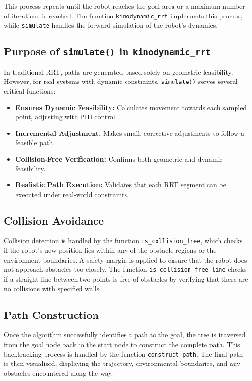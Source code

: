 \documentclass[12pt]{article}
\begin{document}
This process repeats until the robot reaches the goal area or a maximum number of iterations is reached. The function \texttt{kinodynamic\_rrt} implements this process, while \texttt{simulate} handles the forward simulation of the robot’s dynamics.
    
\subsection{Purpose of \texttt{simulate()} in \texttt{kinodynamic\_rrt}}
In traditional RRT, paths are generated based solely on geometric feasibility. However, for real systems with dynamic constraints, \texttt{simulate()} serves several critical functions:
\begin{itemize}
    \item \textbf{Ensures Dynamic Feasibility:} Calculates movement towards each sampled point, adjusting with PID control.
    \item \textbf{Incremental Adjustment:} Makes small, corrective adjustments to follow a feasible path.
    \item \textbf{Collision-Free Verification:} Confirms both geometric and dynamic feasibility.
    \item \textbf{Realistic Path Execution:} Validates that each RRT segment can be executed under real-world constraints.
\end{itemize}
    
\subsection{Collision Avoidance}
Collision detection is handled by the function \texttt{is\_collision\_free}, which checks if the robot’s new position lies within any of the obstacle regions or the environment boundaries. A safety margin is applied to ensure that the robot does not approach obstacles too closely. The function \texttt{is\_collision\_free\_line} checks if a straight line between two points is free of obstacles by verifying that there are no collisions with specified walls.

\subsection{Path Construction}
Once the algorithm successfully identifies a path to the goal, the tree is traversed from the goal node back to the start node to construct the complete path. This backtracking process is handled by the function \texttt{construct\_path}. The final path is then visualized, displaying the trajectory, environmental boundaries, and any obstacles encountered along the way.
\end{document}
